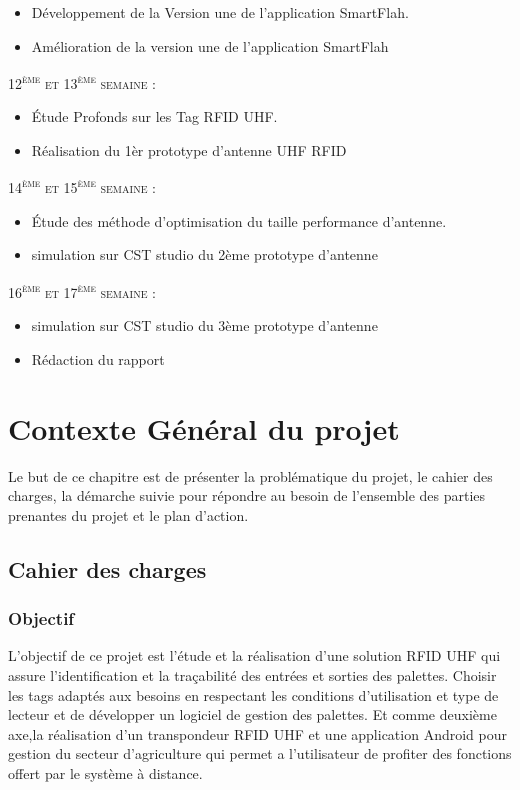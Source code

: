 \documentclass[11pt, a4paper, twoside]{book}
\begin{document}
\begin{itemize}
\item Développement de la Version une de l'application SmartFlah.
\item Amélioration de la version une de l'application SmartFlah
\end{itemize}
\textsc{12\textsuperscript{ème} et 13\textsuperscript{ème} semaine :}
\begin{itemize}
\item Étude Profonds sur les Tag RFID UHF.
\item Réalisation du 1èr prototype d'antenne UHF RFID
\end{itemize}
\textsc{14\textsuperscript{ème} et 15\textsuperscript{ème} semaine :}
\begin{itemize}
\item Étude des méthode d'optimisation du taille performance d'antenne.
\item simulation sur CST studio du 2ème prototype d'antenne
\end{itemize}
\textsc{16\textsuperscript{ème} et 17\textsuperscript{ème} semaine :}
\begin{itemize}
\item simulation sur CST studio du 3ème prototype d'antenne
\item Rédaction du rapport
\end{itemize}



\chapter{Contexte Général du projet}
Le but de ce chapitre est de présenter la problématique du projet, le cahier des charges, la démarche suivie pour répondre au besoin de l’ensemble des parties prenantes du projet et le plan d’action.
\section{Cahier des charges}
\subsection{Objectif}
L’objectif de ce projet est l'étude et la réalisation d’une solution RFID UHF qui assure l’identification et la traçabilité des entrées et sorties des palettes. Choisir les tags adaptés aux besoins en respectant les conditions d’utilisation et type de lecteur et de développer un logiciel de gestion des palettes. 
Et comme deuxième axe,la réalisation d’un transpondeur RFID UHF et une application Android pour gestion du secteur d'agriculture qui permet a
l’utilisateur de profiter des fonctions offert par le système à distance. \\
\end{document}
